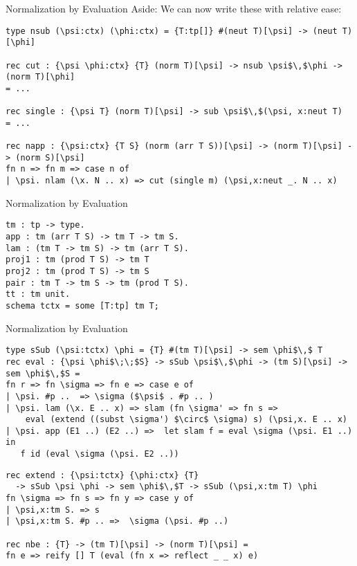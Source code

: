 \documentclass{beamer}
\begin{document}
\begin{frame}[fragile]{Normalization by Evaluation}
Aside: We can now write these with relative ease:
\begin{lstlisting}
type nsub (\psi:ctx) (\phi:ctx) = {T:tp[]} #(neut T)[\psi] -> (neut T)[\phi]

rec cut : {\psi \phi:ctx} {T} (norm T)[\psi] -> nsub \psi$\,$\phi -> (norm T)[\phi]
= ...

rec single : {\psi T} (norm T)[\psi] -> sub \psi$\,$(\psi, x:neut T)
= ...

rec napp : {\psi:ctx} {T S} (norm (arr T S))[\psi] -> (norm T)[\psi] -> (norm S)[\psi]
fn n => fn m => case n of
| \psi. nlam (\x. N .. x) => cut (single m) (\psi,x:neut _. N .. x)
\end{lstlisting}
\end{frame}

\begin{frame}[fragile]{Normalization by Evaluation}
\begin{lstlisting}
tm : tp -> type.
app : tm (arr T S) -> tm T -> tm S.
lam : (tm T -> tm S) -> tm (arr T S).
proj1 : tm (prod T S) -> tm T
proj2 : tm (prod T S) -> tm S
pair : tm T -> tm S -> tm (prod T S).
tt : tm unit.
schema tctx = some [T:tp] tm T;
\end{lstlisting}
\end{frame}

\begin{frame}[fragile]{Normalization by Evaluation}
\begin{lstlisting}
type sSub (\psi:tctx) \phi = {T} #(tm T)[\psi] -> sem \phi$\,$ T
rec eval : {\psi \phi$\;\;$S} -> sSub \psi$\,$\phi -> (tm S)[\psi] -> sem \phi$\,$S =
fn r => fn \sigma => fn e => case e of 
| \psi. #p ..  => \sigma ($\psi$ . #p .. )
| \psi. lam (\x. E .. x) => slam (fn \sigma' => fn s =>
    eval (extend ((subst \sigma') $\circ$ \sigma) s) (\psi,x. E .. x)
| \psi. app (E1 ..) (E2 ..) =>  let slam f = eval \sigma (\psi. E1 ..) in
   f id (eval \sigma (\psi. E2 ..))
\end{lstlisting}

\begin{lstlisting}
rec extend : {\psi:tctx} {\phi:ctx} {T}
  -> sSub \psi \phi -> sem \phi$\,$T -> sSub (\psi,x:tm T) \phi
fn \sigma => fn s => fn y => case y of
| \psi,x:tm S. => s
| \psi,x:tm S. #p .. =>  \sigma (\psi. #p ..)

rec nbe : {T} -> (tm T)[\psi] -> (norm T)[\psi] = 
fn e => reify [] T (eval (fn x => reflect _ _ x) e)
\end{lstlisting}
\end{frame}
\end{document}
